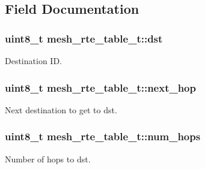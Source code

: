 \subsection{Field Documentation}
\subsubsection[{\texorpdfstring{dst}{dst}}]{\setlength{\rightskip}{0pt plus 5cm}uint8\+\_\+t mesh\+\_\+rte\+\_\+table\+\_\+t\+::dst}\hypertarget{structmesh__rte__table__t_adf70843fcea950180ef74a234a67e9e1}{}\label{structmesh__rte__table__t_adf70843fcea950180ef74a234a67e9e1}


Destination ID. 

\subsubsection[{\texorpdfstring{next\+\_\+hop}{next_hop}}]{\setlength{\rightskip}{0pt plus 5cm}uint8\+\_\+t mesh\+\_\+rte\+\_\+table\+\_\+t\+::next\+\_\+hop}\hypertarget{structmesh__rte__table__t_a3d98c527447c09e408e15d1dd7539348}{}\label{structmesh__rte__table__t_a3d98c527447c09e408e15d1dd7539348}


Next destination to get to dst. 

\subsubsection[{\texorpdfstring{num\+\_\+hops}{num_hops}}]{\setlength{\rightskip}{0pt plus 5cm}uint8\+\_\+t mesh\+\_\+rte\+\_\+table\+\_\+t\+::num\+\_\+hops}\hypertarget{structmesh__rte__table__t_ad233b151e00a89e6c5fdf63c120ba43b}{}\label{structmesh__rte__table__t_ad233b151e00a89e6c5fdf63c120ba43b}


Number of hops to dst. 

